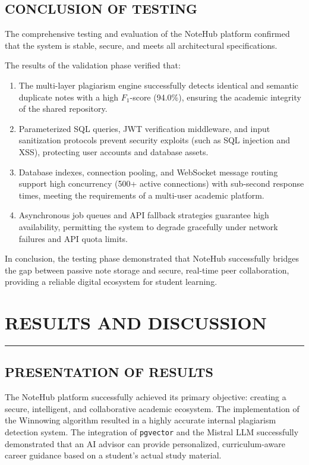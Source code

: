 \documentclass[12,Times new Roman,a4paper]{report}
\begin{document}
\section{CONCLUSION OF TESTING}

The comprehensive testing and evaluation of the NoteHub platform confirmed that the system is stable, secure, and meets all architectural specifications.

The results of the validation phase verified that:
\begin{enumerate}
    \item The multi-layer plagiarism engine successfully detects identical and semantic duplicate notes with a high $F_1$-score (94.0\%), ensuring the academic integrity of the shared repository.
    \item Parameterized SQL queries, JWT verification middleware, and input sanitization protocols prevent security exploits (such as SQL injection and XSS), protecting user accounts and database assets.
    \item Database indexes, connection pooling, and WebSocket message routing support high concurrency (500+ active connections) with sub-second response times, meeting the requirements of a multi-user academic platform.
    \item Asynchronous job queues and API fallback strategies guarantee high availability, permitting the system to degrade gracefully under network failures and API quota limits.
\end{enumerate}

In conclusion, the testing phase demonstrated that NoteHub successfully bridges the gap between passive note storage and secure, real-time peer collaboration, providing a reliable digital ecosystem for student learning.

\chapter{RESULTS AND DISCUSSION}
 \rule{\textwidth}{1pt}
\section{PRESENTATION OF RESULTS}
The NoteHub platform successfully achieved its primary objective: creating a secure, intelligent, and collaborative academic ecosystem. The implementation of the Winnowing algorithm resulted in a highly accurate internal plagiarism detection system. The integration of \texttt{pgvector} and the Mistral LLM successfully demonstrated that an AI advisor can provide personalized, curriculum-aware career guidance based on a student's actual study material.
\end{document}
